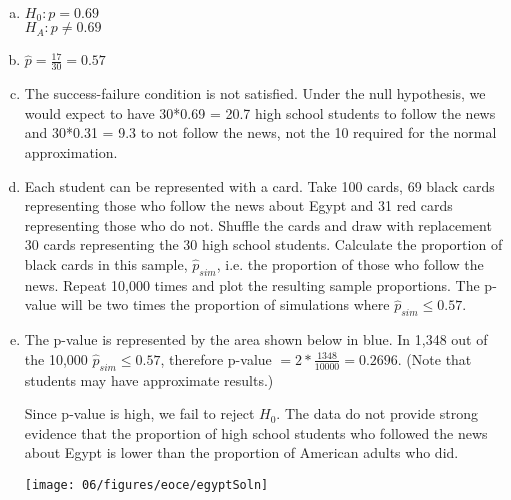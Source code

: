 {
\begin{enumerate}[(a)]
\setlength{\itemsep}{0mm}
\item $H_0: p = 0.69$ \\
$H_A: p \ne 0.69$
\item $\hat{p} = \frac{17}{30} = 0.57$
\item The success-failure condition is not satisfied. Under the null hypothesis, we would expect to have 30*0.69 = 20.7 high school students to follow the news and 30*0.31 = 9.3 to not follow the news, not the 10 required for the normal approximation.
\item Each student can be represented with a card. Take 100 cards, 69 black cards representing those who follow the news about Egypt and 31 red cards representing those who do not. Shuffle the cards and draw with replacement 30 cards representing the 30 high school students. Calculate the proportion of black cards in this sample, $\hat{p}_{sim}$, i.e. the proportion of those who follow the news. Repeat 10,000 times and plot the resulting sample proportions. The p-value will be two times the proportion of simulations where $\hat{p}_{sim} \le 0.57$.
\item The p-value is represented by the area shown below in blue. In 1,348 out of the 10,000 $\hat{p}_{sim} \le 0.57$, therefore p-value $= 2 * \frac{1348}{10000} = 0.2696$. (Note that students may have approximate results.) 
\noindent \begin{minipage}[c]{0.5\textwidth}
Since p-value is high, we fail to reject $H_0$. The data do not provide strong evidence that the proportion of high school students who followed the news about Egypt is lower than the proportion of American adults who did. 
\end{minipage}
\begin{minipage}[c]{0.5\textwidth}
\begin{center}
\texttt{[image: 06/figures/eoce/egyptSoln]}
\end{center}
\end{minipage}
\end{enumerate}
}


